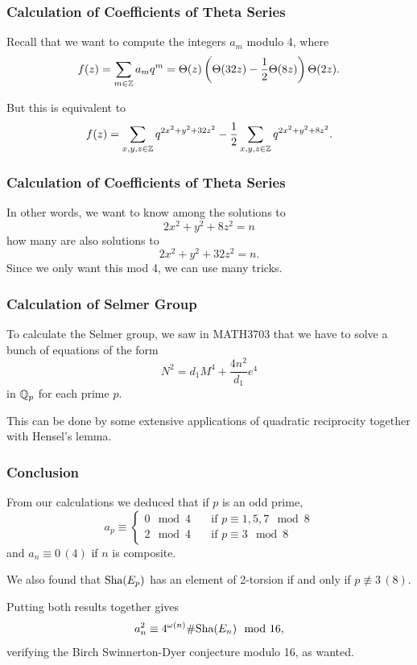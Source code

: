 \documentclass{beamer}
\begin{document}
\begin{frame}
  \frametitle{Calculation of Coefficients of Theta Series}
  Recall that we want to compute the integers $a_m$ modulo 4, where
    \[f(z) = \sum\limits_{m \in {\mathbb Z}} a_m q^m = \Theta(z) \left( \Theta(32z)
      - \frac{1}{2}\Theta(8z)\right) \Theta(2z).\] \pause

  But this is equivalent to 
  \[f(z) = \sum\limits_{x,y,z \in {\mathbb Z}} q^{2x^2 + y^2 + 32z^2} - \frac{1}{2}
  \sum\limits_{x,y,z \in {\mathbb Z}} q^{2x^2 + y^2 + 8z^2}.\] 
\end{frame}

\begin{frame}
  \frametitle{Calculation of Coefficients of Theta Series}
  In other words, we want to know among the solutions to
  \[2x^2 + y^2 + 8z^2 = n\]
  how many are also solutions to
  \[2x^2 + y^2 + 32z^2 = n. \] 
  Since we only want this mod 4, we can use many tricks.
\end{frame}

\begin{frame}
  \frametitle{Calculation of Selmer Group}
  To calculate the Selmer group, we saw in MATH3703 that we have to solve a
  bunch of equations of the form
  \[N^2 = d_1M^4 + \frac{4n^2}{d_1} e^4\]
  in ${\mathbb Q}_p$ for each prime $p.$ \pause
  \bigskip

  This can be done by some extensive applications
  of quadratic reciprocity together
  with Hensel's lemma.
\end{frame}

\begin{frame}
  \frametitle{Conclusion}
  From our calculations we deduced that if $p$ is an odd prime,
  \[a_p \equiv
    \begin{cases}
      0 \mod{4} \quad &\text{if } p \equiv 1,5,7 \mod{8} \\
      2 \mod{4} \quad &\text{if } p \equiv 3 \mod{8}
    \end{cases}
  \]
  and $a_n \equiv 0 \, (4)$ if $n$ is composite. \pause
  \bigskip

  We also found that $\text{\normalfont Sha}(E_p)$ has an element of 2-torsion if and only if $p
  \not\equiv 3 \, (8).$ \pause
  \bigskip

  Putting both results together gives
  \[a_n^2 \equiv 4^{\omega(n)} \# \text{\normalfont Sha}(E_n) \mod{16},\]
  verifying the Birch Swinnerton-Dyer conjecture modulo 16, as wanted.
\end{frame}
\end{document}

